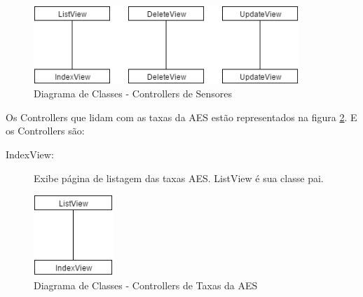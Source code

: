 \begin{figure}[H]
\centering
\includegraphics[width=10cm,keepaspectratio]{figuras/diagrama_cont_sensor.png}
\caption{\label{fig:diagrama-cont-sensor} Diagrama de Classes - Controllers de Sensores}
\end{figure}

Os Controllers que lidam com as taxas da AES estão representados na figura \ref{fig:diagrama-cont-aesrate}. E os Controllers são:
\begin{description}
	\item[IndexView:] Exibe página de listagem das taxas AES. ListView é sua classe pai.
\end{description} 

\begin{figure}[H]
\centering
\includegraphics[width=3cm,keepaspectratio]{figuras/diagrama_cont_aesrate.png}
\caption{\label{fig:diagrama-cont-aesrate} Diagrama de Classes - Controllers de Taxas da AES}
\end{figure}

